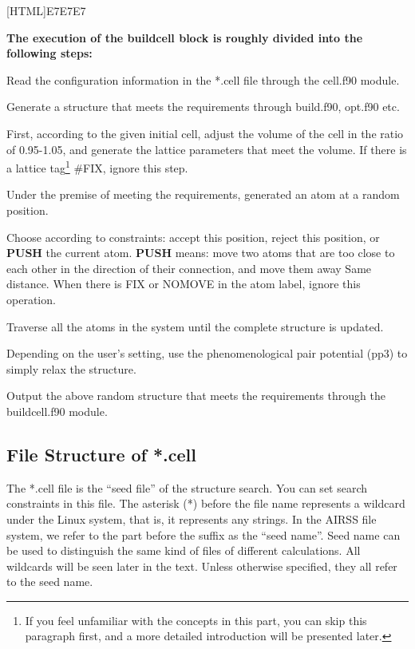 \documentclass[a4paper, 10pt]{article}
\begin{document}
\noindent{}[HTML]{E7E7E7}{\parbox{\textwidth}{%
\noindent \textbf{The execution of the buildcell block is roughly divided into the following steps:}
\begin{maineu}
\item Read the configuration information in the *.cell file through the cell.f90 module.
\item Generate a structure that meets the requirements through build.f90, opt.f90 etc.
  \begin{subeu}
    \item First, according to the given initial cell, adjust the volume of the cell in the ratio of 0.95-1.05, and generate the lattice parameters that meet the volume. If there is a lattice tag\footnote{If you feel unfamiliar with the concepts in this part, you can skip this paragraph first, and a more detailed introduction will be presented later.} \#FIX, ignore this step.
    \item Under the premise of meeting the requirements, generated an atom at a random position.
    \item Choose according to constraints: accept this position, reject this position, or \textbf{PUSH} the current atom. \textbf{PUSH} means: move two atoms that are too close to each other in the direction of their connection, and move them away Same distance. When there is FIX or NOMOVE in the atom label, ignore this operation.
    \item Traverse all the atoms in the system until the complete structure is updated.
    \item Depending on the user's setting, use the phenomenological pair potential (pp3) to simply relax the structure.
  \end{subeu}
\item Output the above random structure that meets the requirements through the buildcell.f90 module.
\end{maineu}}}

\subsection{File Structure of *.cell}

The *.cell file is the ``seed file'' of the structure search. You can set search constraints in this file. The asterisk (*) before the file name represents a wildcard under the Linux system, that is, it represents any strings. In the AIRSS file system, we refer to the part before the suffix as the ``seed name''. Seed name can be used to distinguish the same kind of files of different calculations. All wildcards will be seen later in the text. Unless otherwise specified, they all refer to the seed name.
\end{document}
